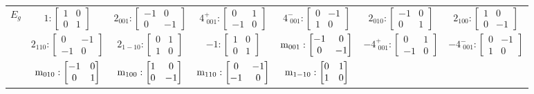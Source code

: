 \documentclass[fleqn,8pt,landscape]{jsarticle}
\begin{document}
\begin{longtable}{ccccccc}
$ E_{g} $ & $ 1:\begin{bmatrix} 1 & 0 \\ 0 & 1 \end{bmatrix} $ & $ 2{}_{001}:\begin{bmatrix} -1 & 0 \\ 0 & -1 \end{bmatrix} $ & $ 4^{+}_{\,\,001}:\begin{bmatrix} 0 & 1 \\ -1 & 0 \end{bmatrix} $ & $ 4^{-}_{\,\,001}:\begin{bmatrix} 0 & -1 \\ 1 & 0 \end{bmatrix} $ & $ 2{}_{010}:\begin{bmatrix} -1 & 0 \\ 0 & 1 \end{bmatrix} $ & $ 2{}_{100}:\begin{bmatrix} 1 & 0 \\ 0 & -1 \end{bmatrix} $ \\
& $ 2{}_{110}:\begin{bmatrix} 0 & -1 \\ -1 & 0 \end{bmatrix} $ & $ 2{}_{1-10}:\begin{bmatrix} 0 & 1 \\ 1 & 0 \end{bmatrix} $ & $ -1:\begin{bmatrix} 1 & 0 \\ 0 & 1 \end{bmatrix} $ & $ {\rm m}_{001}:\begin{bmatrix} -1 & 0 \\ 0 & -1 \end{bmatrix} $ & $ -4^{+}_{\,\,001}:\begin{bmatrix} 0 & 1 \\ -1 & 0 \end{bmatrix} $ & $ -4^{-}_{\,\,001}:\begin{bmatrix} 0 & -1 \\ 1 & 0 \end{bmatrix} $ \\
& $ {\rm m}_{010}:\begin{bmatrix} -1 & 0 \\ 0 & 1 \end{bmatrix} $ & $ {\rm m}_{100}:\begin{bmatrix} 1 & 0 \\ 0 & -1 \end{bmatrix} $ & $ {\rm m}_{110}:\begin{bmatrix} 0 & -1 \\ -1 & 0 \end{bmatrix} $ & $ {\rm m}_{1-10}:\begin{bmatrix} 0 & 1 \\ 1 & 0 \end{bmatrix} $ & $  $ & $  $ \\ \hline

\end{longtable}
\end{document}
